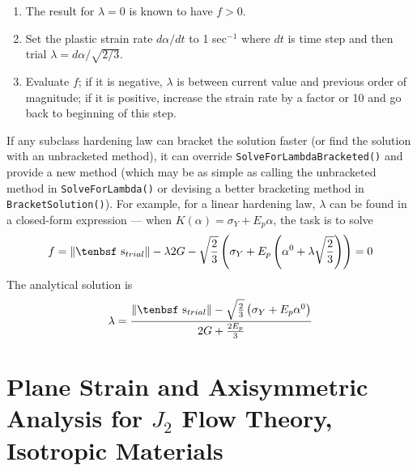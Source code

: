 \documentclass[11pt]{book}
\def\dev{\hbox{\tenbsf s}}
\begin{document}
\begin{enumerate}

\item The result for $\lambda=0$ is known to have $f>0$.

\item Set the plastic strain rate $d\alpha/dt$ to 1 sec$^{-1}$ where $dt$ is time step and then trial $\lambda=d\alpha/\sqrt{2/3}$.

\item Evaluate $f$; if it is negative, $\lambda$ is between current value and previous order of magnitude; if it is positive, increase the strain rate by a factor or 10 and go back to beginning of this step.

\end{enumerate}

If any subclass hardening law can bracket the solution faster (or find the solution with an unbracketed method), it can override {\tt SolveForLambdaBracketed()} and provide a new method (which may be as simple as calling the unbracketed method in {\tt SolveForLambda()} or devising a better bracketing method in {\tt BracketSolution()}). For example, for a linear hardening law, $\lambda$ can be found in a closed-form expression --- when $K(\alpha)=\sigma_Y + E_p\alpha$, the task is to solve
\begin{equation}
      f =  \|\dev_{trial}\| - \lambda 2G -  \sqrt{2\over3} \left(\sigma_Y + E_p\left(\alpha^{0}+ \lambda \sqrt{2\over3}\right)\right) = 0
\end{equation}
The analytical solution is
\begin{equation}
      \lambda = { \|\dev_{trial}\| - \sqrt{2\over3}\left(\sigma_Y + E_p\alpha^{0} \right) \over  2G +  {2E_p\over3} }
\end{equation}

\section{Plane Strain and Axisymmetric Analysis for $J_2$ Flow Theory, Isotropic Materials}
\end{document}
